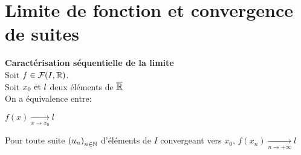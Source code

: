 \documentclass[12pt,twoside,a4paper]{article}
\begin{document}
	\section{Limite de fonction et convergence de suites}
		\begin{prop}
			\textbf{Caract\'erisation s\'equentielle de la limite}\\
			Soit $f\in\mathcal{F}(I,\mathbb{R})$.\\
			Soit $x_0\text{ et } l$ deux \'el\'ements de $\overline{\mathbb{R}}$\\
			On a \'equivalence entre:
			\begin{liste}
				\item $f(x) \mathop{\longrightarrow}\limits_{x\rightarrow x_0} l$
				\item Pour toute suite $\left(u_n \right)_{n\in\mathbb{N}}$ d'\'el\'ements de $I$ convergeant vers $x_0$, $f\left( x_n\right) \mathop{\longrightarrow}\limits_{n\rightarrow +\infty}l$
			\end{liste}
		\end{prop}
\end{document}

